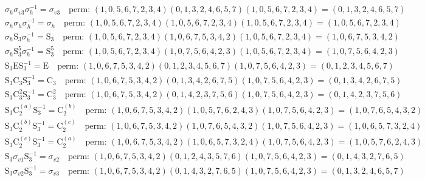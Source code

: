 \begin{align*}
& \sigma_{h} \sigma_{v3} \sigma_{h}^{-1} = \sigma_{v3} \quad \text{perm: }(1, 0, 5, 6, 7, 2, 3, 4)(0, 1, 3, 2, 4, 6, 5, 7)(1, 0, 5, 6, 7, 2, 3, 4) = (0, 1, 3, 2, 4, 6, 5, 7) \\
& \sigma_{h} \sigma_{h} \sigma_{h}^{-1} = \sigma_{h} \quad \text{perm: }(1, 0, 5, 6, 7, 2, 3, 4)(1, 0, 5, 6, 7, 2, 3, 4)(1, 0, 5, 6, 7, 2, 3, 4) = (1, 0, 5, 6, 7, 2, 3, 4) \\
& \sigma_{h} \mathrm{S}_{3} \sigma_{h}^{-1} = \mathrm{S}_{3} \quad \text{perm: }(1, 0, 5, 6, 7, 2, 3, 4)(1, 0, 6, 7, 5, 3, 4, 2)(1, 0, 5, 6, 7, 2, 3, 4) = (1, 0, 6, 7, 5, 3, 4, 2) \\
& \sigma_{h} \mathrm{S}_{3}^{5} \sigma_{h}^{-1} = \mathrm{S}_{3}^{5} \quad \text{perm: }(1, 0, 5, 6, 7, 2, 3, 4)(1, 0, 7, 5, 6, 4, 2, 3)(1, 0, 5, 6, 7, 2, 3, 4) = (1, 0, 7, 5, 6, 4, 2, 3) \\
& \mathrm{S}_{3} \mathrm{E} \mathrm{S}_{3}^{-1} = \mathrm{E} \quad \text{perm: }(1, 0, 6, 7, 5, 3, 4, 2)(0, 1, 2, 3, 4, 5, 6, 7)(1, 0, 7, 5, 6, 4, 2, 3) = (0, 1, 2, 3, 4, 5, 6, 7) \\
& \mathrm{S}_{3} \mathrm{C}_{3} \mathrm{S}_{3}^{-1} = \mathrm{C}_{3} \quad \text{perm: }(1, 0, 6, 7, 5, 3, 4, 2)(0, 1, 3, 4, 2, 6, 7, 5)(1, 0, 7, 5, 6, 4, 2, 3) = (0, 1, 3, 4, 2, 6, 7, 5) \\
& \mathrm{S}_{3} \mathrm{C}_{3}^{2} \mathrm{S}_{3}^{-1} = \mathrm{C}_{3}^{2} \quad \text{perm: }(1, 0, 6, 7, 5, 3, 4, 2)(0, 1, 4, 2, 3, 7, 5, 6)(1, 0, 7, 5, 6, 4, 2, 3) = (0, 1, 4, 2, 3, 7, 5, 6) \\
& \mathrm{S}_{3} \mathrm{C}_{2}^{(a)} \mathrm{S}_{3}^{-1} = \mathrm{C}_{2}^{(b)} \quad \text{perm: }(1, 0, 6, 7, 5, 3, 4, 2)(1, 0, 5, 7, 6, 2, 4, 3)(1, 0, 7, 5, 6, 4, 2, 3) = (1, 0, 7, 6, 5, 4, 3, 2) \\
& \mathrm{S}_{3} \mathrm{C}_{2}^{(b)} \mathrm{S}_{3}^{-1} = \mathrm{C}_{2}^{(c)} \quad \text{perm: }(1, 0, 6, 7, 5, 3, 4, 2)(1, 0, 7, 6, 5, 4, 3, 2)(1, 0, 7, 5, 6, 4, 2, 3) = (1, 0, 6, 5, 7, 3, 2, 4) \\
& \mathrm{S}_{3} \mathrm{C}_{2}^{(c)} \mathrm{S}_{3}^{-1} = \mathrm{C}_{2}^{(a)} \quad \text{perm: }(1, 0, 6, 7, 5, 3, 4, 2)(1, 0, 6, 5, 7, 3, 2, 4)(1, 0, 7, 5, 6, 4, 2, 3) = (1, 0, 5, 7, 6, 2, 4, 3) \\
& \mathrm{S}_{3} \sigma_{v1} \mathrm{S}_{3}^{-1} = \sigma_{v2} \quad \text{perm: }(1, 0, 6, 7, 5, 3, 4, 2)(0, 1, 2, 4, 3, 5, 7, 6)(1, 0, 7, 5, 6, 4, 2, 3) = (0, 1, 4, 3, 2, 7, 6, 5) \\
& \mathrm{S}_{3} \sigma_{v2} \mathrm{S}_{3}^{-1} = \sigma_{v3} \quad \text{perm: }(1, 0, 6, 7, 5, 3, 4, 2)(0, 1, 4, 3, 2, 7, 6, 5)(1, 0, 7, 5, 6, 4, 2, 3) = (0, 1, 3, 2, 4, 6, 5, 7) \\

\end{align*}
